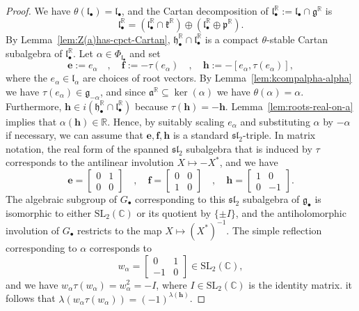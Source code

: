 \documentclass[10pt,a4paper]{amsart}
\newcommand{\C}{\mathbb C}
\newcommand{\Gund}{G_\bullet}
\newcommand{\R}{\mathbb R}
\newcommand{\bfe}{\mathbf{e}}
\newcommand{\bff}{\mathbf{f}}
\newcommand{\bfh}{\mathbf{h}}
\newcommand{\g}{\mathfrak}
\newcommand{\gund}{\g g_\bullet}
\newcommand{\hund}{\g h_\bullet}
\newcommand{\lund}{\g l_\bullet}
\newcommand{\sseq}{\subseteq}
\begin{document}
\begin{proof}
We have $\theta(\lund)=\lund$, and the Cartan decomposition of 
$\lund^\R:=\lund\cap\g g^\R$
 is 
\[
\lund^\R=(\lund^\R\cap\g k^\R)\oplus(\lund^\R\oplus \g p^\R)
.\] By Lemma~\ref{lem:Z(a)has-cpct-Cartan},  $\hund^\R\cap\lund^\R$ is a 
compact $\theta$-stable Cartan subalgebra of $\lund^\R$.  Let $\alpha\in\Phi_{\lund}$ and set
\[
\bfe:=e_\alpha\quad,\quad
\bff:=-\tau(e_\alpha)\quad,\quad
\bfh:=-[e_\alpha,\tau(e_\alpha)],
\] 
where the $e_\alpha\in\g l_\alpha$ are choices of root vectors. 
By Lemma~\ref{lem:kcompalpha-alpha} we have  $\tau(e_\alpha)\in\g g_{-\alpha}$, and since $\g a^\R\sseq \ker(\alpha)$ we have $\theta(\alpha)=\alpha$. Furthermore,  
 $\bfh\in i(\hund^\R\cap \lund^\R)$
because $\tau(\bfh)=-\bfh$. 
Lemma~\ref{lem:roots-real-on-a} implies that $\alpha(\bfh)\in\R$. Hence, by suitably scaling $e_\alpha$ and substituting $\alpha$ by $-\alpha$ if necessary, we can assume that $\bfe,\bff,\bfh$ is a  standard $\g{sl}_2$-triple. In matrix notation, the real form of the spanned $\g{sl}_2$ subalgebra that is induced by $\tau$ corresponds to the antilinear involution $X\mapsto -X^*$, and we have 
\[
\bfe=\begin{bmatrix}
0 & 1\\
0 & 0
\end{bmatrix}\quad,\quad
\bff=\begin{bmatrix}
0 & 0\\1 & 0
\end{bmatrix}\quad,\quad
\bfh=\begin{bmatrix}
1 & 0\\0 & -1
\end{bmatrix}.
\]
The algebraic subgroup of $\Gund$ corresponding to this $\g{sl}_2$ subalgebra of $\gund$ is isomorphic to either  $\mathrm{SL}_2(\C)$ or its quotient by $\{\pm I\}$, 
and the antiholomorphic involution of $\Gund$ restricts to the map $X\mapsto (X^*)^{-1}$. 
The simple reflection corresponding to $\alpha$ corresponds to 
\begin{equation}
\label{eq:w00}
w_\alpha=\begin{bmatrix}
0 & 1\\-1 & 0
\end{bmatrix}\in\mathrm{SL}_2(\C),
\end{equation}
and we have $w_\alpha\tau(w_\alpha)=w_\alpha^2=-I$, where $I\in\mathrm{SL}_2(\C)$ is the identity matrix. it follows that $\lambda(w_\alpha\tau(w_\alpha))=(-1)^{\lambda(\bfh)}$. 


\end{proof}
\end{document}
